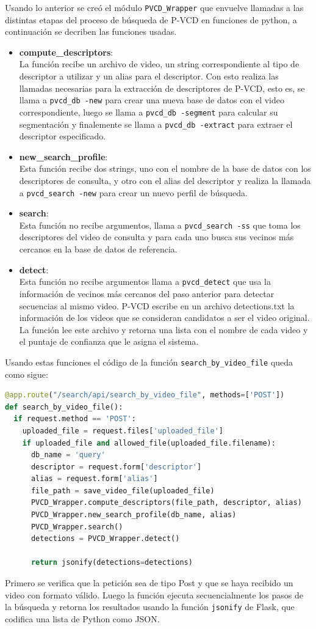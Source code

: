 Usando lo anterior se creó el módulo \texttt{PVCD\_Wrapper} que envuelve llamadas a las distintas etapas del proceso de búsqueda de P-VCD en funciones de python, a continuación se decriben las funciones usadas.
\begin{itemize}
\item \textbf{compute\_descriptors}: \\
La función recibe un archivo de video, un string correspondiente al tipo de descriptor a utilizar y un alias para el descriptor. Con esto realiza las llamadas necesarias para la extracción de descriptores de P-VCD, esto es, se llama a \texttt{pvcd\_db -new} para crear una nueva base de datos con el video correspondiente, luego se llama a \texttt{pvcd\_db -segment} para calcular su segmentación y finalemente se llama a \texttt{pvcd\_db -extract} para extraer el descriptor especificado.
\item \textbf{new\_search\_profile}: \\
Esta función recibe dos strings, uno con el nombre de la base de datos con los descriptores de consulta, y otro con el alias del descriptor y  realiza la llamada a \texttt{pvcd\_search -new} para crear un nuevo perfil de búsqueda.
\item \textbf{search}: \\
Esta función no recibe argumentos, llama a \texttt{pvcd\_search -ss} que toma los descriptores del video de consulta y para cada uno busca sus vecinos más cercanos en la base de datos de referencia.
\item \textbf{detect}: \\
Esta función no recibe argumentos llama a \texttt{pvcd\_detect} que usa la información de vecinos más cercanos del paso anterior para detectar secuencias al mismo video. P-VCD escribe en un archivo detections.txt la información de los videos que se consideran candidatos a ser el video original. La función lee este archivo y retorna una lista con el nombre de cada video y el puntaje de confianza que le asigna el sistema.

\end{itemize}
Usando estas funciones el código de la función \texttt{search\_by\_video\_file} queda como sigue:
\begin{lstlisting}[language=python]
@app.route("/search/api/search_by_video_file", methods=['POST'])
def search_by_video_file():
  if request.method == 'POST':
    uploaded_file = request.files['uploaded_file']
    if uploaded_file and allowed_file(uploaded_file.filename):
      db_name = 'query'
      descriptor = request.form['descriptor']
      alias = request.form['alias']
      file_path = save_video_file(uploaded_file)
      PVCD_Wrapper.compute_descriptors(file_path, descriptor, alias)
      PVCD_Wrapper.new_search_profile(db_name, alias)
      PVCD_Wrapper.search()
      detections = PVCD_Wrapper.detect()
      
      return jsonify(detections=detections)
\end{lstlisting}
Primero se verifica que la petición sea de tipo Post y que se haya recibido un video con formato válido. Luego la función ejecuta secuencialmente los pasos de la búsqueda y retorna los resultados usando la función \texttt{jsonify} de Flask, que codifica una lista de Python como JSON.


